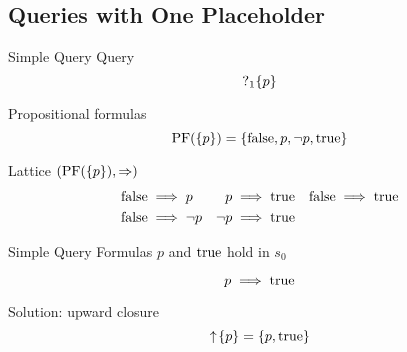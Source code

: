 \subsection[One Placeholder]{Queries with One Placeholder}

%  
%  


\begin{frame}{Simple Query}
  Query  
  \[ \operatorname{?}_1\{p\} \]

  \vfill

  Propositional formulas
  \[ \operatorname{PF}(\{p\}) = \{\operatorname{false}, p, \lnot p, \operatorname{true}\} \]
\end{frame}

\begin{frame}{Lattice $(\operatorname{PF}(\{p\}),\Rightarrow)$}
  \begin{align*}
    \operatorname{false} &\implies p & p &\implies \operatorname{true} & \operatorname{false} &\implies \operatorname{true} \\
    \operatorname{false} &\implies \lnot p & \lnot p &\implies \operatorname{true} & & 
  \end{align*}

  \pause
  
  \begin{center}
  \end{center}
\end{frame}

\begin{frame}{Simple Query}
  Formulas $p$ and $\operatorname{true}$ hold in $s_0$
  
  \[ p \implies \operatorname{true} \]
  
  Solution: upward closure 
  \[ \uparrow \! \left\{ p \right\} = \{ p, \operatorname{true}\} \]
\end{frame}

